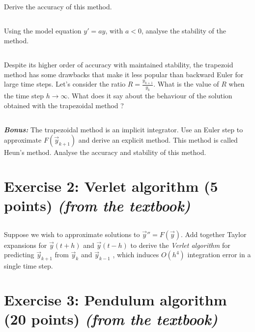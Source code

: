 \subsection{} Derive the accuracy of this method.

\subsection{} Using the model equation $y' = ay$, with $a < 0$, analyse the stability of the method.

\subsection{} Despite its higher order of accuracy with maintained stability, the trapezoid method has some drawbacks that make it less popular than backward Euler for large time steps. Let's consider the ratio $R = \frac{y_{k+1}}{y_k}$. What is the value of $R$ when the time step $h \to \infty$. What does it say about the behaviour of the solution obtained with the trapezoidal method ?

\subsection{} \emph{\textbf{Bonus:}} The trapezoidal method is an implicit integrator. Use an Euler step to approximate $F(\vec{y}_{k+1})$ and derive an explicit method. This method is called Heun's method. Analyse the accuracy and stability of this method.

\section*{Exercise 2: Verlet algorithm \normalsize \textnormal(5 points) \textit{(from the textbook)}}

\subsection{} Suppose we wish to approximate solutions to $\vec{y}'' = F(\vec{y})$. Add together Taylor expansions for $\vec{y}(t + h)$ and $\vec{y}(t - h)$ to derive the \emph{Verlet algorithm} for predicting $\vec{y}_{k+1}$ from $\vec{y}_k$  and $\vec{y}_{k-1}$ , which induces $O(h^4)$ integration error in a single time step.


\section*{Exercise 3: Pendulum algorithm \normalsize \textnormal(20 points) \textit{(from the textbook)}}


